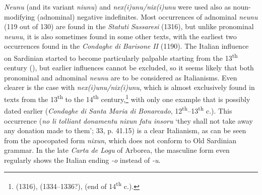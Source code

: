 \documentclass[output=paper,colorlinks,citecolor=brown]{langscibook}
\begin{document}
\textit{Neunu} (and its variant \textit{niunu}) and \textit{nex(i)unu/nix(i)unu} were used also as noun-modifying (adnominal) negative indefinites. Most occurrences of adnominal \textit{neunu} (119 out of 130) are found in the \textit{Statuti Sassaresi} (1316), but unlike pronominal \textit{neunu}, it is also sometimes found in some other texts, with the earliest two occurrences found in the \textit{Condaghe di Barisone II} (1190). The Italian influence on Sardinian started to become particularly palpable starting from the 13\textsuperscript{th} century (\cite[cf.][234--235]{Wagner1997}), but earlier influences cannot be excluded, so it seems likely that both pronominal and adnominal \textit{neunu} are to be considered as Italianisms. Even clearer is the case with \textit{nex(i)unu/nix(i)unu}, which is almost exclusively found in texts from the 13\textsuperscript{th} to the 14\textsuperscript{th} century,\footnote{ (1316),  (1334--1336?),  (end of 14\textsuperscript{th} c.).} with only one example that is possibly dated earlier (\textit{Condaghe di Santa Maria di Bonarcado}, 12\textsuperscript{th}--13\textsuperscript{th} c.). This occurrence (\textit{no li tolliant donamentu nixun fatu insoru} ‘they shall not take away any donation made to them’;   33, p. 41.15) is a clear Italianism, as can be seen from the apocopated form \textit{nixun}, which does not conform to Old Sardinian grammar. In the late \textit{Carta de Logu} of Arborea, the masculine form even regularly shows the Italian ending \textit{-o} instead of \textit{-u}.
\end{document}

